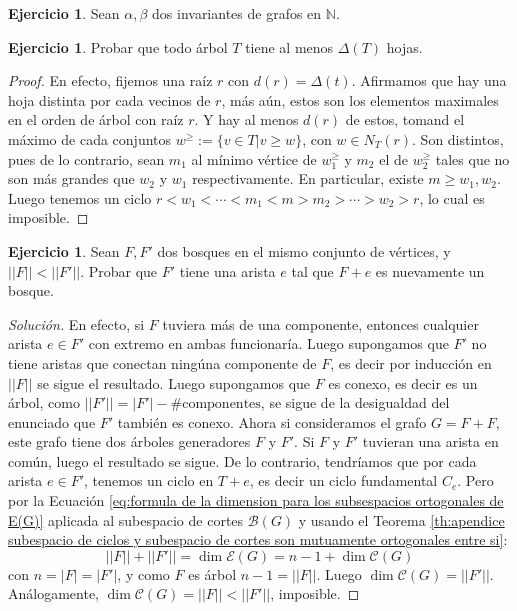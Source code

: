 \documentclass[12pt]{report}
\theoremstyle{plain}
\theoremstyle{definition}
\newtheorem{exercise}[theorem]{Ejercicio}
\newenvironment{solution}{\begin{proof}[Solución]}{\end{proof}}
\newcommand{\naturals}{\mathbb{N}}
\newcommand{\abs}[1]{\left \vert #1 \right \vert}
\newcommand{\Abs}[1]{\left \vert \left \vert #1 \right \vert \right \vert}
\begin{document}
\begin{exercise}
Sean $\alpha, \beta$ dos invariantes de grafos en $\naturals$.
\end{exercise}

\begin{exercise}
Probar que todo árbol $T$ tiene al menos $\Delta (T)$ hojas.
\end{exercise}
\begin{proof}
En efecto, fijemos una raíz $r$ con $d (r) = \Delta (t)$. Afirmamos que hay una hoja distinta por cada vecinos de $r$, más aún, estos son los elementos maximales en el orden de árbol con raíz $r$. Y hay al menos $d(r)$ de estos, tomand el máximo de cada conjuntos $w^{\geq} := \{ v \in T | v \geq w \}$, con $w \in N_T (r)$. Son distintos, pues de lo contrario, sean $m_1$ al mínimo vértice de $w_1^{\geq}$ y $m_2$ el de $w_2^{\geq}$ tales que no son más grandes que $w_2$ y $w_1$ respectivamente. En particular, existe $m \geq w_1,w_2$. Luego tenemos un ciclo $r <  w_1 < \cdots < m_1 < m > m_2 > \cdots > w_2 > r$, lo cual es imposible.
\end{proof}




\begin{exercise}
Sean $F,F'$ dos bosques en el mismo conjunto de vértices, y $\Abs F < \Abs  {F'}$. Probar que $F'$ tiene una arista $
e$ tal que $F + e$ es nuevamente un bosque.
\end{exercise}
\begin{solution}
En efecto, si $F$ tuviera más de una componente, entonces cualquier arista $e \in F'$ con extremo en ambas
funcionaría. Luego supongamos que $F'$ no tiene aristas que conectan ningúna componente de $F$, es decir por
inducción en $\Abs F$ se sigue el resultado. Luego supongamos que $F$ es conexo, es decir es un árbol, como $\Abs {F'} = \abs {F'}- \# \text{componentes}$, se sigue de la desigualdad del enunciado que $F'$ también es conexo. Ahora si consideramos el grafo $G = F + F$, este grafo tiene dos árboles generadores $F$ y $F'$. Si $F$ y $F'$ tuvieran una arista en común, luego el resultado se sigue. De lo contrario, tendríamos que por cada arista $e \in F'$, tenemos un ciclo en $T+e$, es decir un ciclo fundamental $C_e$. Pero por la Ecuación \eqref{eq:formula de la dimension para los subsespacios ortogonales de E(G)} aplicada al subespacio de cortes $\mathcal B (G)$ y usando el Teorema \ref{th:apendice subespacio de ciclos y subespacio de cortes son mutuamente ortogonales entre si}:
\[
    \Abs F + \Abs {F'} = \dim \mathcal E (G) = n -1 + \dim \mathcal C (G)
\]
con $n = \abs F = \abs {F'}$, y como $F$ es árbol $n-1 = \Abs F$. Luego $\dim \mathcal C (G) = \Abs {F'}$. Análogamente, $\dim \mathcal C (G) = \Abs {F} < \Abs {F'}$, imposible.
\end{solution}
\end{document}
